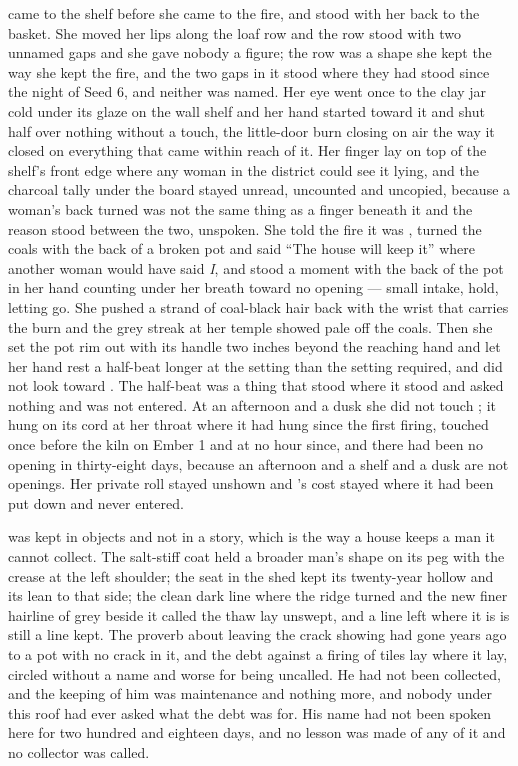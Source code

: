  came to the shelf before she came to the fire, and stood with her back to the basket. She moved her lips along the loaf row and the row stood with two unnamed gaps and she gave nobody a figure; the row was a shape she kept the way she kept the fire, and the two gaps in it stood where they had stood since the night of Seed 6, and neither was named. Her eye went once to the clay jar cold under its glaze on the wall shelf and her hand started toward it and shut half over nothing without a touch, the little-door burn closing on air the way it closed on everything that came within reach of it. Her finger lay on top of the shelf's front edge where any woman in the district could see it lying, and the charcoal tally under the board stayed unread, uncounted and uncopied, because a woman's back turned was not the same thing as a finger beneath it and the reason stood between the two, unspoken. She told the fire it was , turned the coals with the back of a broken pot and said “The house will keep it” where another woman would have said \emph{I}, and stood a moment with the back of the pot in her hand counting under her breath toward no opening --- small intake, hold, letting go. She pushed a strand of coal-black hair back with the wrist that carries the burn and the grey streak at her temple showed pale off the coals. Then she set the pot rim out with its handle two inches beyond the reaching hand and let her hand rest a half-beat longer at the setting than the setting required, and did not look toward . The half-beat was a thing that stood where it stood and asked nothing and was not entered. At an afternoon and a dusk she did not touch ; it hung on its cord at her throat where it had hung since the first firing, touched once before the kiln on Ember 1 and at no hour since, and there had been no opening in thirty-eight days, because an afternoon and a shelf and a dusk are not openings. Her private roll stayed unshown and 's cost stayed where it had been put down and never entered.

 was kept in objects and not in a story, which is the way a house keeps a man it cannot collect. The salt-stiff coat held a broader man's shape on its peg with the crease at the left shoulder; the seat in the shed kept its twenty-year hollow and its lean to that side; the clean dark line where the  ridge turned and the new finer hairline of grey beside it called the thaw lay unswept, and a line left where it is is still a line kept. The proverb about leaving the crack showing had gone years ago to a pot with no crack in it, and the debt against a firing of tiles lay where it lay, circled without a name and worse for being uncalled. He had not been collected, and the keeping of him was maintenance and nothing more, and nobody under this roof had ever asked what the debt was for. His name had not been spoken here for two hundred and eighteen days, and no lesson was made of any of it and no collector was called.

